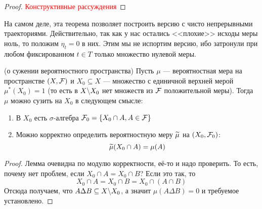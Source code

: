 \begin{proof}
	\textcolor{red}{Конструктивные рассуждения}
\end{proof}

\begin{note}
	На самом деле, эта теорема позволяет построить версию с чисто непрерывными траекториями. Действительно, так как у нас остались <<плохие>> исходы меры ноль, то положим $\eta_t = 0$ в них. Этим мы не испортим версию, ибо затронули при любом фиксированном $t \in T$ только множество нулевой меры.
\end{note}

\begin{lemma} (о сужении вероятностного пространства)
	Пусть $\mu$ --- вероятностная мера на пространстве $(X, \mathcal{F})$ и $X_0 \subseteq X$ --- множество с единичной верхней мерой $\mu^*(X_0) = 1$ (то есть в $X \backslash X_0$ нет множеств из $\mathcal{F}$ положительной меры). Тогда $\mu$ можно сузить на $X_0$ в следующем смысле:
	\begin{enumerate}
		\item В $X_0$ есть $\sigma$-алгебра $\mathcal{F}_0 = \{X_0 \cap A, A \in \mathcal{F}\}$
		
		\item Можно корректно определить вероятностную меру $\widetilde{\mu}$ на $(X_0, \mathcal{F}_0)$:
		\[
			\widetilde{\mu}(X_0 \cap A) = \mu(A)
		\]
	\end{enumerate}
\end{lemma}

\begin{proof}
	Лемма очевидна по модулю корректности, её-то и надо проверить. То есть, почему нет проблем, если $X_0 \cap A = X_0 \cap B$? Если это так, то
	\[
		X_0 \cap A = X_0 \cap B = X_0 \cap (A \cap B)
	\]
	Отсюда получаем, что $A \Delta B \subseteq X \backslash X_0$, а значит $\mu(A \Delta B) = 0$ и требуемое установлено.
\end{proof}